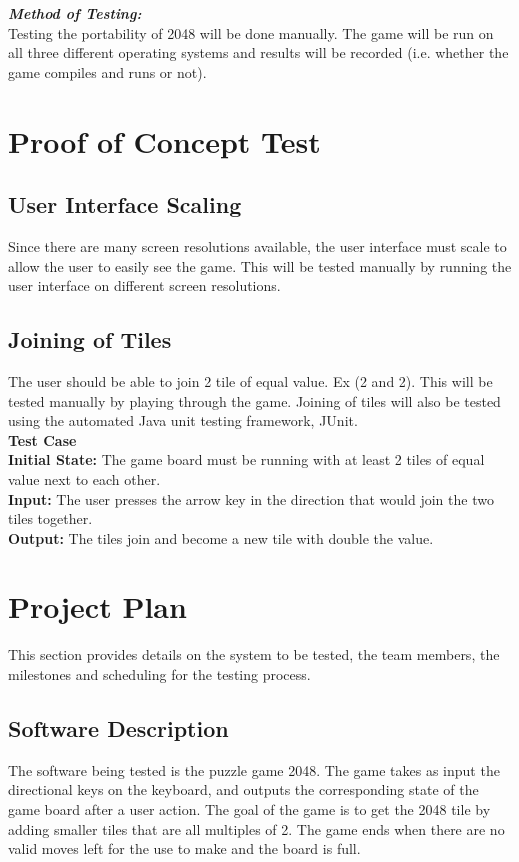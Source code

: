 \documentclass[12pt]{article}
\begin{document}
\textbf{\emph{Method of Testing:}}\\
Testing the portability of 2048 will be done manually. The game will be run on
all three different operating systems and results will be recorded (i.e.
whether the game compiles and runs or not).


\section{Proof of Concept Test}

\subsection{User Interface Scaling}
Since there are many screen resolutions available, the user interface must
scale to allow the user to easily see the game. This will be tested manually by
running the user interface on different screen resolutions.

\subsection{Joining of Tiles}
The user should be able to join 2 tile of equal value. Ex (2 and 2). This will
be tested manually by playing through the game. Joining of tiles will also be
tested using the automated Java unit testing framework, JUnit.\\

\textbf{Test Case}\\
\textbf{Initial State:} The game board must be running with at least 2 tiles of
equal value next to each other. \\
\textbf{Input:} The user presses the arrow key in the direction that would join
the two tiles together. \\
\textbf{Output:} The tiles join and become a new tile with double the value.\\

\section{Project Plan}
This section provides details on the system to be tested, the team members, the
milestones and scheduling for the testing process.

\subsection{Software Description}
The software being tested is the puzzle game 2048. The game takes as input the
directional keys on the keyboard, and outputs the corresponding state of the
game board after a user action. The goal of the game is to get the 2048 tile by
adding smaller tiles that are all multiples of 2. The game ends when there are
no valid moves left for the use to make and the board is full.
\end{document}
